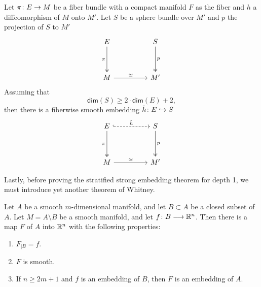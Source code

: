 \begin{proposition}\cite[Lemma~1]{N80}\label{ch4:: prop: fiberwise emb}
    Let $\pi\colon E \rightarrow M$ be a fiber bundle with a compact manifold $F$ as the fiber and $h$ a diffeomorphism of $M$ onto $M'$. Let $S$ be a sphere bundle over $M'$ and $p$ the projection of $S$ to $M'$ 
    \begin{equation}
        \begin{tikzcd}[ampersand replacement=\&]
            E \&\& S \\
            \\
            M \&\& {M'}
            \arrow["\pi"', two heads, from=1-1, to=3-1]
            \arrow["p", two heads, from=1-3, to=3-3]
            \arrow["\simeq", from=3-1, to=3-3]
        \end{tikzcd}
    \end{equation}
    Assuming that 
    \begin{equation}
        \mathsf{dim}(S) \geq 2\cdot \mathsf{dim}(E) + 2,
    \end{equation}
    then there is a fiberwise smooth embedding $\tilde{h}\colon E \hookrightarrow S$ 
    \begin{equation}
        \begin{tikzcd}[ampersand replacement=\&]
            E \&\& S \\
            \\
            M \&\& {M'}
            \arrow["{\tilde{h}}", dashed, hook, from=1-1, to=1-3]
            \arrow["\pi"', two heads, from=1-1, to=3-1]
            \arrow["p", two heads, from=1-3, to=3-3]
            \arrow["\simeq", from=3-1, to=3-3]
        \end{tikzcd}
    \end{equation} 
\end{proposition}

Lastly, before proving the stratified strong embedding theorem for depth 1, we must introduce yet another theorem of Whitney.

\begin{theorem}\label{ch4:: thm: whitney extension theorem}
    Let $A$ be a smooth $m$-dimensional manifold, and let $B\subset A$ be a closed subset of $A$. Let $M=A\setminus B$ be a smooth manifold, and let $f\colon B \longrightarrow \mathbb R^{n}$. Then there is a map $F$ of $A$ into $\mathbb R^{n}$ with the following properties:
    \begin{enumerate}
        \item $F_{|B}=f$.
        \item $F$ is smooth.
        \item If $n\geq 2m +1$ and $f$ is an embedding of $B$, then $F$ is an embedding of $A$.
    \end{enumerate}
\end{theorem}


